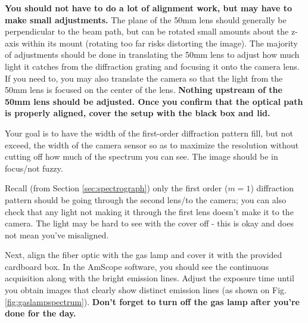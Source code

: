 \documentclass{../lab}
\begin{document}
\textbf{You should not have to do a lot of alignment work, but may have to make small adjustments.} The plane of the 50mm lens should generally be perpendicular to the beam path, but can be rotated small amounts about the z-axis within its mount (rotating too far risks distorting the image). The majority of adjustments should be done in translating the 50mm lens to adjust how much light it catches from the diffraction grating and focusing it onto the camera lens. If you need to, you may also translate the camera so that the light from the 50mm lens is focused on the center of the lens. \textbf{Nothing upstream of the 50mm lens should be adjusted. Once you confirm that the optical path is properly aligned, cover the setup with the black box and lid.}

Your goal is to have the width of the first-order diffraction pattern fill, but not exceed, the width of the camera sensor so as to maximize the resolution without cutting off how much of the spectrum you can see. The image should be in focus/not fuzzy.

Recall (from Section \ref{sec:spectrograph}) only the first order ($m=1$) diffraction pattern should be going through the second lens/to the camera; you can also check that any light not making it through the first lens doesn't make it to the camera. The light may be hard to see with the cover off - this is okay and does not mean you've misaligned.





Next, align the fiber optic with the gas lamp and cover it with the provided cardboard box. In the AmScope software, you should see the continuous acquisition along with the bright emission lines. Adjust the exposure time until you obtain images that clearly show distinct emission lines (as shown on Fig. \ref{fig:gaslampspectrum}). \textbf{Don't forget to turn off the gas lamp after you're done for the day.}
\end{document}
